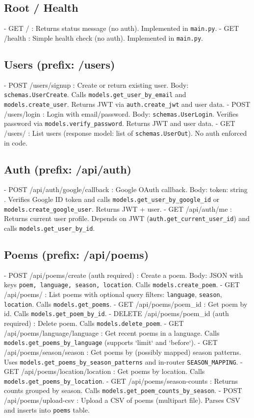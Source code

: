 \documentclass[11pt]{article}
\begin{document}
\subsection*{Root / Health}
- GET / : Returns status message (no auth). Implemented in \texttt{main.py}.
- GET /health : Simple health check (no auth). Implemented in \texttt{main.py}.

\subsection*{Users (prefix: /users)}
- POST /users/signup : Create or return existing user. Body: \texttt{schemas.UserCreate}. Calls \texttt{models.get\_user\_by\_email} and \texttt{models.create\_user}. Returns JWT via \texttt{auth.create\_jwt} and user data.
- POST /users/login : Login with email/password. Body: \texttt{schemas.UserLogin}. Verifies password via \texttt{models.verify\_password}. Returns JWT and user data.
- GET /users/ : List users (response model: list of \texttt{schemas.UserOut}). No auth enforced in code.

\subsection*{Auth (prefix: /api/auth)}
- POST /api/auth/google/callback : Google OAuth callback. Body: { token: string }. Verifies Google ID token and calls \texttt{models.get\_user\_by\_google\_id} or \texttt{models.create\_google\_user}. Returns JWT + user.
- GET /api/auth/me : Returns current user profile. Depends on JWT (\texttt{auth.get\_current\_user\_id}) and calls \texttt{models.get\_user\_by\_id}.

\subsection*{Poems (prefix: /api/poems)}
- POST /api/poems/create (auth required) : Create a poem. Body: JSON with keys \texttt{poem, language, season, location}. Calls \texttt{models.create\_poem}.
- GET /api/poems/ : List poems with optional query filters: \texttt{language}, \texttt{season}, \texttt{location}. Calls \texttt{models.get\_poems}.
- GET /api/poems/{poem\_id} : Get poem by id. Calls \texttt{models.get\_poem\_by\_id}.
- DELETE /api/poems/{poem\_id} (auth required) : Delete poem. Calls \texttt{models.delete\_poem}.
- GET /api/poems/language/{language} : Get recent poems in a language. Calls \texttt{models.get\_poems\_by\_language} (supports `limit` and `before`).
- GET /api/poems/season/{season} : Get poems by (possibly mapped) season patterns. Uses \texttt{models.get\_poems\_by\_season\_patterns} and in-router \texttt{SEASON\_MAPPING}.
- GET /api/poems/location/{location} : Get poems by location. Calls \texttt{models.get\_poems\_by\_location}.
- GET /api/poems/season-counts : Returns counts grouped by season. Calls \texttt{models.get\_poem\_counts\_by\_season}.
- POST /api/poems/upload-csv : Upload a CSV of poems (multipart file). Parses CSV and inserts into \texttt{poems} table.
\end{document}
